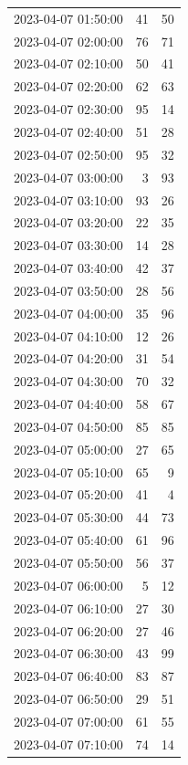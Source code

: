\documentclass[
  letterpaper,
  DIV=11,
  numbers=noendperiod]{scrartcl}
\begin{document}
\begin{tabular}{lrr}
2023-04-07 01:50:00 &    41 &    50 \\
2023-04-07 02:00:00 &    76 &    71 \\
2023-04-07 02:10:00 &    50 &    41 \\
2023-04-07 02:20:00 &    62 &    63 \\
2023-04-07 02:30:00 &    95 &    14 \\
2023-04-07 02:40:00 &    51 &    28 \\
2023-04-07 02:50:00 &    95 &    32 \\
2023-04-07 03:00:00 &     3 &    93 \\
2023-04-07 03:10:00 &    93 &    26 \\
2023-04-07 03:20:00 &    22 &    35 \\
2023-04-07 03:30:00 &    14 &    28 \\
2023-04-07 03:40:00 &    42 &    37 \\
2023-04-07 03:50:00 &    28 &    56 \\
2023-04-07 04:00:00 &    35 &    96 \\
2023-04-07 04:10:00 &    12 &    26 \\
2023-04-07 04:20:00 &    31 &    54 \\
2023-04-07 04:30:00 &    70 &    32 \\
2023-04-07 04:40:00 &    58 &    67 \\
2023-04-07 04:50:00 &    85 &    85 \\
2023-04-07 05:00:00 &    27 &    65 \\
2023-04-07 05:10:00 &    65 &     9 \\
2023-04-07 05:20:00 &    41 &     4 \\
2023-04-07 05:30:00 &    44 &    73 \\
2023-04-07 05:40:00 &    61 &    96 \\
2023-04-07 05:50:00 &    56 &    37 \\
2023-04-07 06:00:00 &     5 &    12 \\
2023-04-07 06:10:00 &    27 &    30 \\
2023-04-07 06:20:00 &    27 &    46 \\
2023-04-07 06:30:00 &    43 &    99 \\
2023-04-07 06:40:00 &    83 &    87 \\
2023-04-07 06:50:00 &    29 &    51 \\
2023-04-07 07:00:00 &    61 &    55 \\
2023-04-07 07:10:00 &    74 &    14 \\

\end{tabular}
\end{document}
